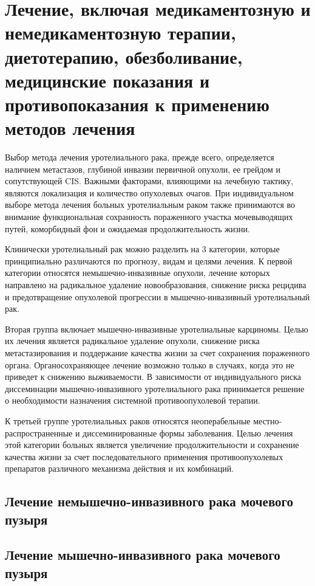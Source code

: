 \section{Лечение, включая медикаментозную и немедикаментозную терапии, диетотерапию, обезболивание, медицинские показания и противопоказания к применению методов лечения}
\label{sec:Treatment}
Выбор метода лечения уротелиального рака, прежде всего, определяется наличием метастазов, глубиной инвазии первичной опухоли, ее грейдом и сопутствующей CIS. Важными факторами, влияющими на лечебную тактику, являются локализация и количество опухолевых очагов. При индивидуальном выборе метода лечения больных уротелиальным раком также принимаются во внимание функциональная сохранность пораженного участка мочевыводящих путей, коморбидный фон и ожидаемая продолжительность жизни.

Клинически уротелиальный рак можно разделить на 3 категории, которые принципиально различаются по прогнозу, видам и целями лечения. К первой категории относятся немышечно-инвазивные опухоли, лечение которых направлено на радикальное удаление новообразования, снижение риска рецидива и предотвращение опухолевой прогрессии в мышечно-инвазивный уротелиальный рак.

Вторая группа включает мышечно-инвазивные уротелиальные карциномы. Целью их лечения является радикальное удаление опухоли, снижение риска метастазирования и поддержание качества жизни за счет сохранения пораженного органа. Органосохраняющее лечение возможно только в случаях, когда это не приведет к снижению выживаемости. В зависимости от индивидуального риска диссеминации мышечно-инвазивного уротелиального рака принимается решение о необходимости назначения системной противоопухолевой терапии.

К третьей группе уротелиальных раков относятся неоперабельные местно-распространенные и диссеминированные формы заболевания. Целью лечения этой категории больных является увеличение продолжительности и сохранение качества жизни за счет последовательного применения противоопухолевых препаратов различного механизма действия и их комбинаций.


\subsection{Лечение немышечно-инвазивного рака мочевого пузыря}
\label{sec:}


\subsection{Лечение мышечно-инвазивного рака мочевого пузыря}
\label{sec:}



